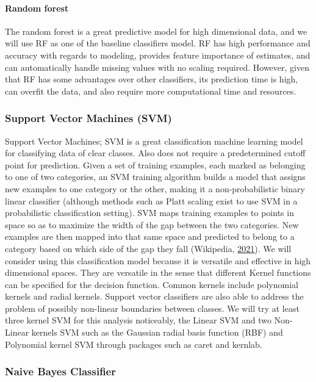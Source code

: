 \documentclass[
  10pt,
]{article}
\begin{document}
\paragraph{Random forest}

The random forest is a great predictive model for high dimensional data, and we will use RF as one of the baseline classifiers model. RF has high performance and accuracy with regards to modeling, provides feature importance of estimates, and can automatically handle missing values with no scaling required. However, given that RF has some advantages over other classifiers, its prediction time is high, can overfit the data, and also require more computational time and resources.

\hypertarget{support-vector-machines-svm}{%
\subsubsection{Support Vector Machines (SVM)}\label{support-vector-machines-svm}}

Support Vector Machines; SVM is a great classification machine learning model for classifying data of clear classes. Also does not require a predetermined cutoff point for prediction. Given a set of training examples, each marked as belonging to one of two categories, an SVM training algorithm builds a model that assigns new examples to one category or the other, making it a non-probabilistic binary linear classifier (although methods such as Platt scaling exist to use SVM in a probabilistic classification setting). SVM maps training examples to points in space so as to maximize the width of the gap between the two categories. New examples are then mapped into that same space and predicted to belong to a category based on which side of the gap they fall (Wikipedia, \protect\hyperlink{ref-wikipedia}{2021}).
We will consider using this classification model because it is versatile and effective in high dimensional spaces. They are versatile in the sense that different Kernel functions can be specified for the decision function. Common kernels include polynomial kernels and radial kernels. Support vector classifiers are also able to address the problem of possibly non-linear boundaries between classes. We will try at least three kernel SVM for this analysis noticeably, the Linear SVM and two Non-Linear kernels SVM such as the Gaussian radial basis function (RBF) and Polynomial kernel SVM through packages such as caret and kernlab.

\hypertarget{naive-bayes-classifier}{%
\subsubsection{Naive Bayes Classifier}\label{naive-bayes-classifier}}
\end{document}
